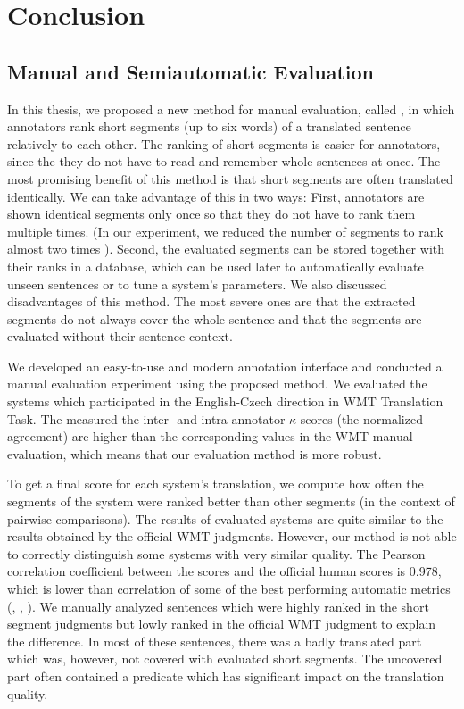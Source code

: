 \chapter{Conclusion}
\label{chapter:conclusion}

\section{Manual and Semiautomatic Evaluation}

In this thesis, we proposed a new method for manual evaluation, called
, in which annotators rank short segments (up to six words) of
a translated sentence relatively to each other. The ranking of short segments
is easier for annotators, since the they do not have to read and remember whole
sentences at once. The most promising benefit of this method is that short
segments are often translated identically.  We can take advantage of this in
two ways: First, annotators are shown identical segments only once so that they
do not have to rank them multiple times. (In our experiment, we reduced the
number of segments to rank almost two times ). Second,
the evaluated segments can be stored together with their ranks in a database,
which can be used later to automatically evaluate unseen sentences or to tune a
system's parameters. We also discussed disadvantages of this method. The most
severe ones are that the extracted segments do not always cover the whole
sentence and that the segments are evaluated without their sentence context.

We developed an easy-to-use and modern annotation interface and conducted a
manual evaluation experiment using the proposed method. We evaluated the
systems which participated in the English-Czech direction in WMT Translation
Task. The measured the inter- and intra-annotator $\kappa$ scores (the
normalized agreement) are higher than the corresponding values in the WMT
manual evaluation, which means that our evaluation method is more robust.

To get a final score for each system's translation, we compute how often the
segments of the system were ranked better than other segments (in the context
of pairwise comparisons).  The results of evaluated systems are quite similar
to the results obtained by the official WMT judgments. However, our method is
not able to correctly distinguish some systems with very similar quality. The
Pearson correlation coefficient between the  scores and the
official human scores is 0.978, which is lower than correlation of some of the
best performing automatic metrics (, ,
). We manually analyzed sentences which were highly ranked in the
short segment judgments but lowly ranked in the official WMT judgment to
explain the difference. In most of these sentences, there was a badly
translated part which was, however, not covered with evaluated short segments.
The uncovered part often contained a predicate which has significant impact on
the translation quality. 

